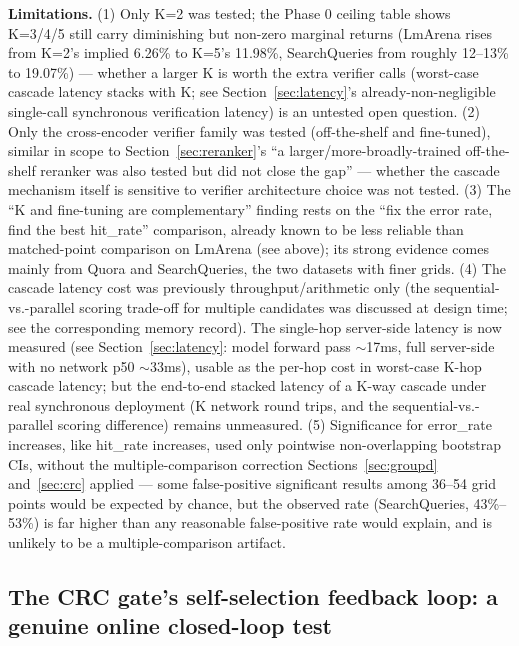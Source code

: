 \documentclass[11pt]{article}
\begin{document}
\textbf{Limitations.} (1) Only K=2 was tested; the Phase 0 ceiling table shows K=3/4/5 still carry diminishing but non-zero marginal returns (LmArena rises from K=2's implied 6.26\% to K=5's 11.98\%, SearchQueries from roughly 12--13\% to 19.07\%) --- whether a larger K is worth the extra verifier calls (worst-case cascade latency stacks with K; see Section~\ref{sec:latency}'s already-non-negligible single-call synchronous verification latency) is an untested open question. (2) Only the cross-encoder verifier family was tested (off-the-shelf and fine-tuned), similar in scope to Section~\ref{sec:reranker}'s ``a larger/more-broadly-trained off-the-shelf reranker was also tested but did not close the gap'' --- whether the cascade mechanism itself is sensitive to verifier architecture choice was not tested. (3) The ``K and fine-tuning are complementary'' finding rests on the ``fix the error rate, find the best hit\_rate'' comparison, already known to be less reliable than matched-point comparison on LmArena (see above); its strong evidence comes mainly from Quora and SearchQueries, the two datasets with finer grids. (4) The cascade latency cost was previously throughput/arithmetic only (the sequential-vs.-parallel scoring trade-off for multiple candidates was discussed at design time; see the corresponding memory record). The single-hop server-side latency is now measured (see Section~\ref{sec:latency}: model forward pass $\sim$17ms, full server-side with no network p50 $\sim$33ms), usable as the per-hop cost in worst-case K-hop cascade latency; but the end-to-end stacked latency of a K-way cascade under real synchronous deployment (K network round trips, and the sequential-vs.-parallel scoring difference) remains unmeasured. (5) Significance for error\_rate increases, like hit\_rate increases, used only pointwise non-overlapping bootstrap CIs, without the multiple-comparison correction Sections~\ref{sec:groupd} and~\ref{sec:crc} applied --- some false-positive significant results among 36--54 grid points would be expected by chance, but the observed rate (SearchQueries, 43\%--53\%) is far higher than any reasonable false-positive rate would explain, and is unlikely to be a multiple-comparison artifact.

\subsection{The CRC gate's self-selection feedback loop: a genuine online closed-loop test}
\label{sec:selfselect}
\end{document}
